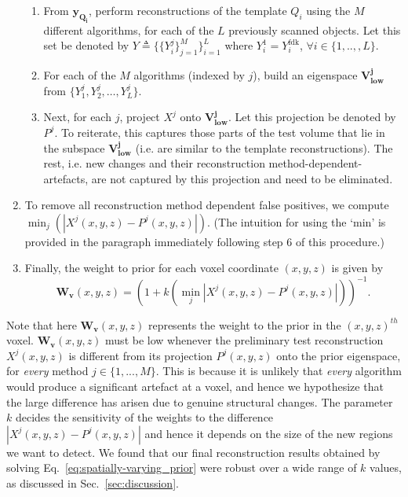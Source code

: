 \documentclass[journal]{IEEEtran}
\begin{document}
\begin{enumerate}
\begin{enumerate}
  \item From $\boldsymbol{y_{Q_i}}$, perform reconstructions of the template $Q_i$ using the $M$ different algorithms, for each of the $L$ previously scanned objects. Let this set be denoted by $Y \triangleq \{\{Y_{i}^j\}_{j=1}^M\}_{i=1}^L$ where $Y^{1}_i = Y^{\text{fdk}}_i$, $\forall i \in \{1,..,,L\}$.


  \item For each of the $M$ algorithms (indexed by $j$), build an eigenspace $\boldsymbol{V_\text{low}^j}$ from $\{Y_1^j,Y_2^j, \ldots, Y_{L}^j\}$. %

  \item Next, for each $j$,  project $X^j$  onto $\boldsymbol{V_\text{low}^j}$. Let this projection be denoted by $P^j$. To reiterate, this captures those parts of the test volume that lie in the subspace $\boldsymbol{V_\text{low}^j}$ (i.e. are similar to the template reconstructions). The rest, i.e. new changes and their reconstruction method-dependent-artefacts, are not captured by this projection and need to be eliminated.
  \end{enumerate}
\item To remove all reconstruction method dependent false positives, we compute $\min_{j}(|X^j(x,y,z) - P^j(x,y,z)|)$. (The intuition for using the `min' is provided in the paragraph immediately following step 6 of this procedure.)
\item Finally, the weight to prior for each voxel coordinate $(x,y,z)$ is given by
  \begin{equation} 
    \boldsymbol{W_v}(x,y,z) = (1+k(\min_{j}|X^j(x,y,z) - P^j(x,y,z)|))^{-1}.
    \label{eq:weightsEq}
  \end{equation}
\end{enumerate}
\vspace{0.01mm}
Note that here $\boldsymbol{W_v}(x,y,z)$ represents the weight to the prior in the $(x,y,z)^{th}$ voxel. $\boldsymbol{W_v}(x,y,z)$ must be
low whenever the preliminary test reconstruction $X^j(x,y,z)$ is different from its projection $P^j(x,y,z)$ onto the prior eigenspace, for \emph{every} method $j \in \{1,...,M\}$. This is
because it is unlikely that \emph{every} algorithm would produce a significant artefact at a voxel, and hence we hypothesize that the large difference has arisen due to genuine structural changes. The parameter $k$ decides the sensitivity of the weights to the difference $|X^j(x,y,z) - P^j(x,y,z)|$ and hence it depends on the size of the new regions we want to detect.  
We found that our final reconstruction results obtained by
solving Eq.~\ref{eq:spatially-varying_prior} were robust over a wide range of $k$ values, as discussed in Sec.~\ref{sec:discussion}.
\end{document}
